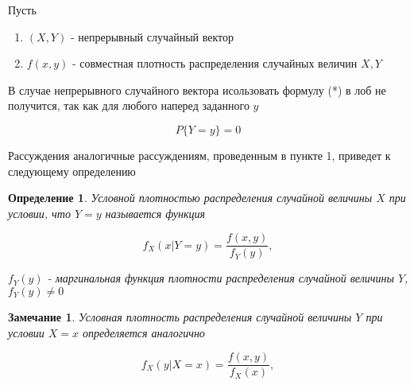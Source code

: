 \documentclass[a4paper, 14pt]{report}
\newtheorem{defenition}{Определение}[section]
\newtheorem{note}{Замечание}[section]
\begin{document}
Пусть

\begin{enumerate}
    \item $(X,Y)$ - непрерывный случайный вектор
    \item $f(x,y)$ - совместная плотность распределения случайных величин $X,Y$
\end{enumerate}

В случае непрерывного случайного вектора исользовать формулу (*) в лоб не получится, так как для любого наперед заданного $y$

$$
P\{Y=y\}=0
$$

Рассуждения аналогичные рассуждениям, проведенным в пункте 1, приведет к следующему определению

\begin{defenition}
    Условной плотностью распределения случайной величины $X$ при условии, что $Y=y$ называется функция

    $$
    f_X(x|Y=y)=\frac{f(x,y)}{f_Y(y)},
    $$

    $f_Y(y)$ - маргинальная функция плотности распределения случайной величины $Y$, $f_Y(y) \ne 0$
\end{defenition}

\begin{note}
    Условная плотность распределения случайной величины $Y$ при условии $X=x$ определяется аналогично

    $$
    f_X(y|X=x)=\frac{f(x,y)}{f_X(x)},
    $$
\end{note}
\end{document}
